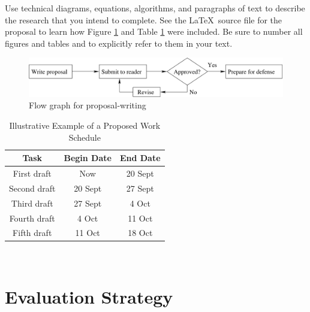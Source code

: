 \documentclass[11pt]{article}
\begin{document}

Use technical diagrams, equations, algorithms, and paragraphs of text
to describe the research that you intend to complete. See the \LaTeX\ source
file for the proposal to learn how Figure \ref{intro-fig1} and Table
\ref{intro-tab1} were included. Be sure to number all figures and tables and to
explicitly refer to them in your text.

\begin{figure}[htbp]
  \centering
  \includegraphics[width=5in]{flow.pdf}
  \caption{Flow graph for proposal-writing}
  \label{intro-fig1}
\end{figure}

\begin{table}[htbp]
  \centering
  \begin{tabular}{|c||c|c|}
    \hline

    \bf Task     & \bf Begin Date & \bf End Date \\ \hline\hline
    First draft  & Now            & 20 Sept      \\ \hline
    Second draft & 20 Sept        & 27 Sept      \\ \hline
    Third draft  & 27 Sept        & 4 Oct        \\ \hline
    Fourth draft & 4 Oct          & 11 Oct       \\ \hline
    Fifth draft  & 11 Oct         & 18 Oct       \\ \hline

  \end{tabular}
  \caption{Illustrative Example of a Proposed Work Schedule}~\label{intro-tab1}
\end{table}

\section{Evaluation Strategy}
\label{sec:evaluate}

\end{document}
